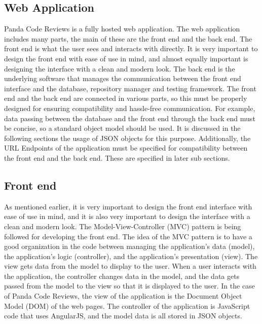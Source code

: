 
\subsection{Web Application}

Panda Code Reviews is a fully hosted web application. The web application
includes many parts, the main of these are the front end and the back end. The
front end is what the user sees and interacts with directly. It is very
important to design the front end with ease of use in mind, and almost equally
important is designing the interface with a clean and modern look. The back end
is the underlying software that manages the communication between the front end
interface and the database, repository manager and testing framework. The front
end and the back end are connected in various parts, so this must be properly
designed for ensuring compatibility and hassle-free communication. For example,
data passing between the database and the front end through the back end must be
concise, so a standard object model should be used. It is discussed in the
following sections the usage of JSON objects for this purpose. Additionally, the
URL Endpoints of the application must be specified for compatibility between the
front end and the back end. These are specified in later sub sections.

\subsection{Front end}

As mentioned earlier, it is very important to design the front end interface
with ease of use in mind, and it is also very important to design the interface
with a clean and modern look. The Model-View-Controller (MVC) pattern is being
followed for developing the front end. The idea of the MVC pattern is to have a
good organization in the code between managing the application's data (model),
the application's logic (controller), and the application's presentation (view).
The view gets data from the model to display to the user. When a user interacts
with the application, the controller changes data in the model, and the data
gets passed from the model to the view so that it is displayed to the user. In
the case of Panda Code Reviews, the view of the application is the Document
Object Model (DOM) of the web pages. The controller of the application is
JavaScript code that uses AngularJS, and the model data is all stored in JSON
objects.


